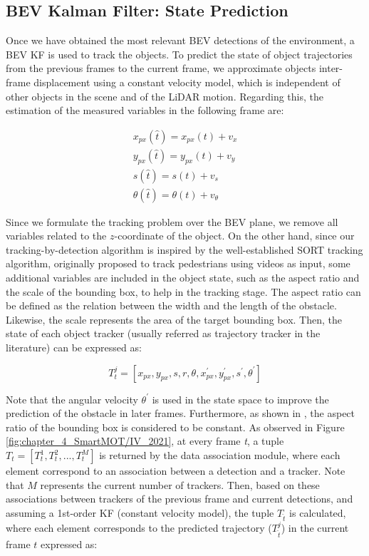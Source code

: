 \subsection{BEV Kalman Filter: State Prediction}
\label{subsec:4_smartmot_state_prediction}

Once we have obtained the most relevant \ac{BEV} detections of the environment, a \ac{BEV} \ac{KF} is used to track the objects. To predict the state of object trajectories from the previous frames to the current frame, we approximate objects inter-frame displacement using a constant velocity model, which is independent of other objects in the scene and of the \ac{LiDAR} motion. Regarding this, the estimation of the measured variables in the following frame are:

\begin{equation}
	\begin{split}
		x_{px}(\hat{t})=x_{px}(t)+v_{x} \\
		y_{px}(\hat{t})=y_{px}(t)+v_{y} \\
		s(\hat{t})=s(t)+v_{s} \\
		\theta(\hat{t})=\theta(t)+v_{\theta}
	\end{split}
\end{equation}

Since we formulate the tracking problem over the \ac{BEV} plane, we remove all variables related to the $\textit{z}$-coordinate of the object. On the other hand, since our tracking-by-detection algorithm is inspired by the well-established \ac{SORT} \cite{bewley2016simple} tracking algorithm, originally proposed to track pedestrians using videos as input, some additional variables are included in the object state, such as the aspect ratio and the scale of the bounding box, to help in the tracking stage. The aspect ratio can be defined as the relation between the width and the length of the obstacle. Likewise, the scale represents the area of the target bounding box. Then, the state of each object tracker (usually referred as trajectory tracker in the literature) can be expressed as:

\begin{equation}
	\label{state}
	T_{t}^{j} = [x_{px},y_{px},s,r,\theta,x_{px}^{'},y_{px}^{'},s^{'},\theta^{'}]
\end{equation}

Note that the angular velocity $\theta^{'}$ is used in the state space to improve the prediction of the obstacle in later frames. Furthermore, as shown in \cite{bewley2016simple}, the aspect ratio of the bounding box is considered to be constant. As observed in Figure \ref{fig:chapter_4_SmartMOT/IV_2021}, at every frame \textit{t}, a tuple $T_{t}=[T_{t}^{1},T_{t}^{2}, ...,T_{t}^{M}]$ is returned by the data association module, where each element correspond to an association between a detection and a tracker. Note that $M$ represents the current number of trackers. Then, based on these associations between trackers of the previous frame and current detections, and assuming a 1st-order \ac{KF} (constant velocity model), the tuple $T_{\hat{t}}$ is calculated, where each element corresponds to the predicted trajectory ($T_{\hat{t}}^{j}$) in the current frame $\textit{t}$ expressed as:

